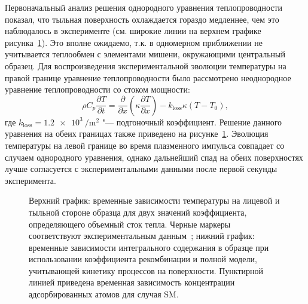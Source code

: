 Первоначальный анализ решения однородного уравнения теплопроводности показал, что тыльная поверхность охлаждается гораздо медленнее, чем это наблюдалось в эксперименте (см. широкие линии на верхнем графике рисунка~\cref{fig:ch3/QSPA_T_ret}). Это вполне ожидаемо, т.к. в одномерном приближении не учитывается теплообмен с элементами мишени, окружающими центральный образец. Для воспроизведения экспериментальной эволюции температуры на правой границе уравнение теплопроводности было рассмотрено неоднородное уравнение теплопроводности со стоком мощности:
\begin{equation}
	\label{eq:ch3/QSPA_heat_transfer}
	\rho C_p \frac{\partial T}{ \partial t} = \frac{\partial}{\partial x}\left( \kappa \frac{\partial T}{\partial x} \right)  - k_\mathrm{loss} \kappa \left( T-T_0 \right),
\end{equation}
где \( k_\mathrm{loss}=\SI{1.2e3}{\per\meter\squared} \) "--- подгоночный коэффициент. Решение данного уравнения на обеих границах также приведено на рисунке~\cref{fig:ch3/QSPA_T_ret}. Эволюция температуры на левой границе во время плазменного импульса совпадает со случаем однородного уравнения, однако дальнейший спад на обеих поверхностях лучше согласуется с экспериментальными данными после первой секунды эксперимента.

\begin{figure}[ht]
	\caption{Верхний график: временные зависимости температуры на лицевой и тыльной стороне образца для двух значений коэффициента, определяющего объемный сток тепла. Черные маркеры соответствуют экспериментальным данным~\cite{Poskakalov2020}; нижний график: временные зависимости интегрального содержания в образце при использовании коэффициента рекомбинации и полной модели, учитывающей кинетику процессов на поверхности. Пунктирной линией приведена временная зависимость концентрации адсорбированных атомов для случая SM. }\label{fig:ch3/QSPA_T_ret}
\end{figure}

